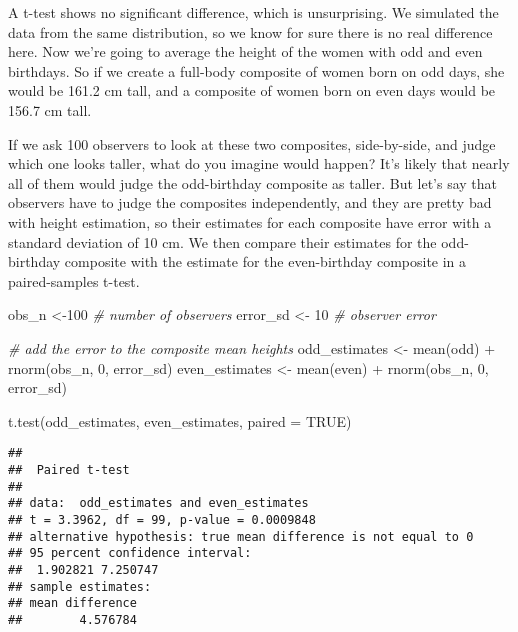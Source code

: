 \documentclass[
  doc,floatsintext]{apa6}
\newenvironment{Shaded}{\begin{snugshade}}{\end{snugshade}}
\newcommand{\AttributeTok}[1]{\textcolor[rgb]{0.77,0.63,0.00}{#1}}
\newcommand{\CommentTok}[1]{\textcolor[rgb]{0.56,0.35,0.01}{\textit{#1}}}
\newcommand{\ConstantTok}[1]{\textcolor[rgb]{0.00,0.00,0.00}{#1}}
\newcommand{\DecValTok}[1]{\textcolor[rgb]{0.00,0.00,0.81}{#1}}
\newcommand{\FunctionTok}[1]{\textcolor[rgb]{0.00,0.00,0.00}{#1}}
\newcommand{\NormalTok}[1]{#1}
\newcommand{\OtherTok}[1]{\textcolor[rgb]{0.56,0.35,0.01}{#1}}
\newcommand{\SpecialCharTok}[1]{\textcolor[rgb]{0.00,0.00,0.00}{#1}}
\begin{document}
A t-test shows no significant difference, which is unsurprising. We simulated the data from the same distribution, so we know for sure there is no real difference here. Now we're going to average the height of the women with odd and even birthdays. So if we create a full-body composite of women born on odd days, she would be 161.2 cm tall, and a composite of women born on even days would be 156.7 cm tall.

If we ask 100 observers to look at these two composites, side-by-side, and judge which one looks taller, what do you imagine would happen? It's likely that nearly all of them would judge the odd-birthday composite as taller. But let's say that observers have to judge the composites independently, and they are pretty bad with height estimation, so their estimates for each composite have error with a standard deviation of 10 cm. We then compare their estimates for the odd-birthday composite with the estimate for the even-birthday composite in a paired-samples t-test.

\begin{Shaded}
\begin{Highlighting}[]
\NormalTok{obs\_n }\OtherTok{\textless{}{-}}\DecValTok{100} \CommentTok{\# number of observers}
\NormalTok{error\_sd }\OtherTok{\textless{}{-}} \DecValTok{10} \CommentTok{\# observer error}

\CommentTok{\# add the error to the composite mean heights}
\NormalTok{odd\_estimates }\OtherTok{\textless{}{-}} \FunctionTok{mean}\NormalTok{(odd) }\SpecialCharTok{+} \FunctionTok{rnorm}\NormalTok{(obs\_n, }\DecValTok{0}\NormalTok{, error\_sd)}
\NormalTok{even\_estimates }\OtherTok{\textless{}{-}} \FunctionTok{mean}\NormalTok{(even) }\SpecialCharTok{+} \FunctionTok{rnorm}\NormalTok{(obs\_n, }\DecValTok{0}\NormalTok{, error\_sd)}

\FunctionTok{t.test}\NormalTok{(odd\_estimates, even\_estimates, }\AttributeTok{paired =} \ConstantTok{TRUE}\NormalTok{)}
\end{Highlighting}
\end{Shaded}

\begin{verbatim}
## 
##  Paired t-test
## 
## data:  odd_estimates and even_estimates
## t = 3.3962, df = 99, p-value = 0.0009848
## alternative hypothesis: true mean difference is not equal to 0
## 95 percent confidence interval:
##  1.902821 7.250747
## sample estimates:
## mean difference 
##        4.576784
\end{verbatim}
\end{document}
